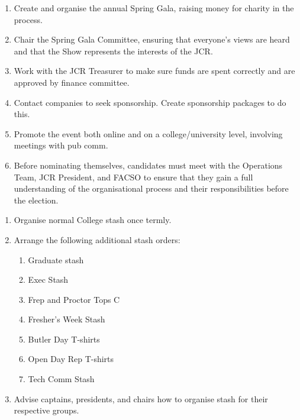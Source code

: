 \begin{enumerate}
    \item Create and organise the annual Spring Gala, raising money for charity in the process.
    \item Chair the Spring Gala Committee, ensuring that everyone’s views are heard and that the Show represents the interests of the JCR.
    \item Work with the JCR Treasurer to make sure funds are spent correctly and are approved by finance committee.
    \item Contact companies to seek sponsorship. Create sponsorship packages to do this. 
    \item Promote the event both online and on a college/university level, involving meetings with pub comm.
    \item Before nominating themselves, candidates must meet with the Operations Team, JCR President, and FACSO to ensure that they gain a full understanding of the organisational process and their responsibilities before the election.
    
\end{enumerate}

\begin{enumerate}
    \item Organise normal College stash once termly.
    \item Arrange the following additional stash orders:
    \begin{enumerate}
        \item Graduate stash
        \item Exec Stash 
        \item Frep and Proctor Tops C
        \item Fresher’s Week Stash 
        \item Butler Day T-shirts 
        \item Open Day Rep T-shirts 
        \item Tech Comm Stash
    \end{enumerate}
    \item Advise captains, presidents, and chairs how to organise stash for their respective groups.
    
\end{enumerate}

